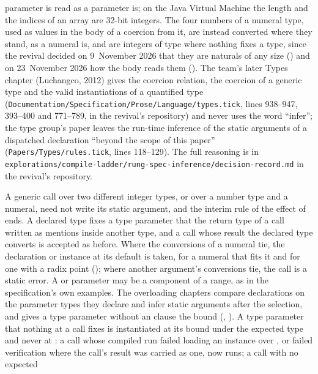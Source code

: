\begin{description}
parameter is read as a  parameter is; on the Java
Virtual Machine the length and the indices of an array are 32-bit integers.
The four numbers of a numeral type, used as values in the body of a coercion
from it, are instead converted where they stand, as a numeral is, and are
integers of type  where nothing fixes a type, since the
revival decided on 9~November 2026 that they are naturals of any size
() and on 23~November 2026 how the body reads them
().
The team's later Types chapter (Luchangco, 2012) gives the coercion relation,
the coercion of a generic type and the valid instantiations of a quantified
type (\nolinkurl{Documentation/Specification/Prose/Language/types.tick}, lines
938--947, 393--400 and 771--789, in the revival's repository) and never uses
the word ``infer''; the type group's paper leaves the run-time inference of the
static arguments of a dispatched declaration ``beyond the scope of this paper''
(\nolinkurl{Papers/Types/rules.tick}, lines 118--129).
The full reasoning is in
\nolinkurl{explorations/compile-ladder/rung-spec-inference/decision-record.md}
in the revival's repository.
\item[Effect] A generic call over two different integer types, or over a number
type and a numeral, need not write its static argument, and the interim rule
of the effect of  ends.
A declared type fixes a type parameter that the return type of a call written
as  mentions inside another type, and a call whose result the
declared type converts is accepted as before.
Where the conversions of a numeral tie, the declaration or instance at its
default is taken,  for a numeral that fits it and
 for one with a radix point ();
where another argument's conversions tie, the call is a static error.
A  or  parameter may be a component of a range, as in the
specification's own examples.
The overloading chapters compare declarations on the parameter types they
declare and infer static arguments after the selection, and 
gives a type parameter without an  clause the bound 
(, ).
A type parameter that nothing at a call fixes is instantiated at its bound
under the expected type and never at : a call whose compiled
run failed loading an instance over , or failed verification
where the call's result was carried as one, now runs; a call with no expected

\end{description}
